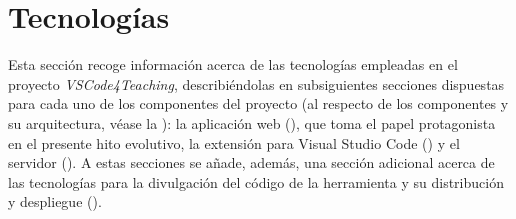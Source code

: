 \section{Tecnologías}
\label{sec:tecnologias}

Esta sección recoge información acerca de las tecnologías empleadas en el proyecto \textit{VSCode4Teaching}, describiéndolas en subsiguientes secciones dispuestas para cada uno de los componentes del proyecto (al respecto de los componentes y su arquitectura, véase la ): la aplicación web (), que toma el papel protagonista en el presente hito evolutivo, la extensión para Visual Studio Code () y el servidor (). A estas secciones se añade, además, una sección adicional acerca de las tecnologías para la divulgación del código de la herramienta y su distribución y despliegue ().





